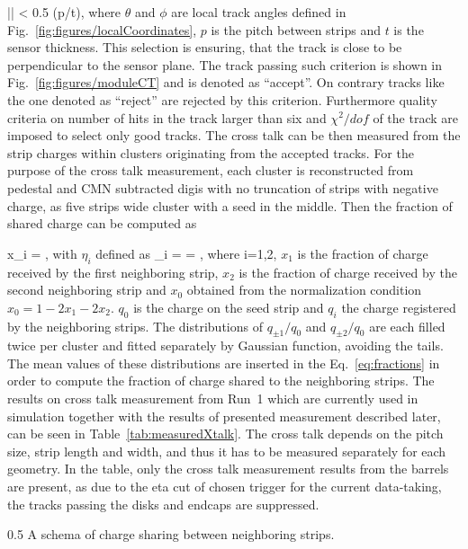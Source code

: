 {
|\theta {}\phi| < 0.5 \times (p/t),
}
where $\theta$ and $\phi$ are local track angles defined in Fig.~\ref{fig:figures/localCoordinates}, $p$ is the pitch between strips and $t$ is the sensor thickness. This selection is ensuring, that the track is close to be perpendicular to the sensor plane. The track passing such criterion is shown in Fig.~\ref{fig:figures/moduleCT} and is denoted as ``accept''. On contrary tracks like the one denoted as ``reject'' are rejected by this criterion. Furthermore quality criteria on number of hits in the track larger than six and $\chi^{2}/dof$ of the track are imposed to select only good tracks. The cross talk can be then measured from the strip charges within clusters originating from the accepted tracks. For the purpose of the cross talk measurement, each cluster is reconstructed from pedestal and CMN subtracted digis with no truncation of strips with negative charge, as five strips wide cluster with a seed in the middle. Then the fraction of shared charge can be computed as


{
x_{i} =  ,
}
with $\eta_{i}$ defined as
{
\eta_{\pm i} =  =  ,
}
where i=1,2, $x_{1}$ is the fraction of charge received by the first neighboring strip,  $x_{2}$ is the fraction of charge received by the second neighboring strip and $x_{0}$ obtained from the normalization condition $x_{0} = 1-2x_{1}-2x_{2}$. $q_{0}$ is the charge on the seed strip and $q_{i}$ the charge registered by the neighboring strips. The distributions of $q_{\pm 1}/q_{0}$ and $q_{\pm 2}/q_{0}$ are each filled twice per cluster and fitted separately by Gaussian function, avoiding the tails. The mean values of these distributions are inserted in the Eq.~\ref{eq:fractions} in order to compute the fraction of charge shared to the neighboring strips. The results on cross talk measurement from Run~1 which are currently used in simulation together with the results of presented measurement described later, can be seen in Table~\ref{tab:measuredXtalk}. The cross talk depends on the pitch size, strip length and width, and thus it has to be measured separately for each geometry. In the table, only the cross talk measurement results from the barrels are present, as due to the eta cut of chosen trigger for the current data-taking, the tracks passing the disks and endcaps are suppressed. 

                 {0.5}       %
                 { A schema of charge sharing between neighboring strips. }

